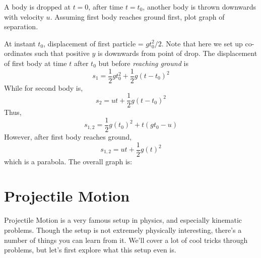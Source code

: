 \begin{example}
    A body is dropped at $t = 0$, after time $t = t_0$, another body is thrown downwards with velocity 
    $u$. Assuming first body reaches ground first, plot graph of separation.
    \begin{soln}
        At instant $t_0$, displacement of first particle = ${gt_0^2}/{2}$. Note that here we set up 
        co-ordinates such that positive $y$ is downwards from point of drop. 
        The displacement of first body at time $t$ after $t_0$ but before \textit{reaching ground} is
        \[
        s_1 = \frac{1}{2}gt_0^2 + \frac{1}{2}g(t - t_0)^2
        \]
        While for second body is,
        \[
        s_2 = ut + \frac{1}{2}g(t - t_0)^2 
        \]
        Thus,
        \[
        s_{1,2} = \frac{1}{2}g(t_0)^2 + t(g t_0 - u) 
        \]
        However, after first body reaches ground,
        \[
        s_{1,2} = ut + \frac{1}{2}g(t)^2 
        \]
        which is a parabola. The overall graph is:
        \begin{center}
        \end{center}
    
    \end{soln}
\end{example}

\section{Projectile Motion}

    Projectile Motion is a very famous setup in physics, and especially kinematic
    problems. Though the setup is not extremely physically interesting, there's a 
    number of things you can learn from it. We'll cover a lot of cool tricks through
    problems, but let's first explore what this setup even is.

